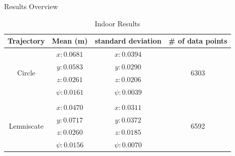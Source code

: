\begin{frame}{Results Overview}
	\begin{table}[h!]
		\centering
		\caption{Indoor Results}
		\begin{tabular}{||c c c c||} 
			\hline
			Trajectory & Mean (m) & standard deviation & \# of data points  \\ %
			\hline\hline
			\multirow{4}{*}{Circle} & $x:0.0681$ & $x:0.0394$ & \multirow{4}{*}{6303} \\
			& $y:0.0583$ & $y:0.0290$& \\
			& $z:0.0261$ & $z:0.0206$& \\
			& $\psi:0.0161$ & $\psi:0.0039$& \\ 
			& & & \\
			\multirow{4}{*}{Lemniscate} & $x:0.0470 $ & $x:0.0311$ & \multirow{4}{*}{6592} \\
			& $y:0.0717$ & $y:0.0372$& \\
			& $z:0.0260$ & $z:0.0185$& \\
			& $\psi:0.0156$ & $\psi:0.0070$& \\
			\hline
		\end{tabular}
		\label{table:indoor_res}
	\end{table}
	\end{frame}
